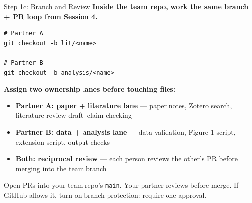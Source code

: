 \documentclass[aspectratio=169, 11pt]{beamer}
\begin{document}
\begin{frame}[fragile]{Step 1c: Branch and Review}
  \textbf{Inside the team repo, work the same branch + PR loop from Session 4.}

  \vspace{0.3em}
  \begin{lstlisting}[basicstyle=\ttfamily\scriptsize]
# Partner A
git checkout -b lit/<name>

# Partner B
git checkout -b analysis/<name>
  \end{lstlisting}

  \vspace{0.4em}
  \textbf{Assign two ownership lanes before touching files:}
  \begin{itemize}\small
    \item \textbf{Partner A: paper + literature lane} --- paper notes, Zotero search, literature review draft, claim checking
    \item \textbf{Partner B: data + analysis lane} --- data validation, Figure 1 script, extension script, output checks
    \item \textbf{Both: reciprocal review} --- each person reviews the other's PR before merging into the team branch
  \end{itemize}

  \vspace{0.4em}
  \alert{\small Open PRs into your team repo's \texttt{main}. Your partner reviews before merge. If GitHub allows it, turn on branch protection: require one approval.}
\end{frame}
\end{document}

